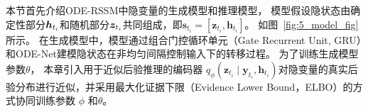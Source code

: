 本节首先介绍ODE-RSSM中隐变量的生成模型和推理模型，
模型假设隐状态由确定性部分$\boldsymbol{h}_{t_i}$和随机部分$\boldsymbol{z}_{t_i}$共同组成，即$\boldsymbol{s}_{t_{i}}=[\boldsymbol{z}_{t_{i}},\boldsymbol{h}_{t_{i}}]$。
如图~\ref{fig:5_model_fig}所示。
在生成模型中，模型通过组合门控循环单元（Gate Recurrent Unit, GRU）和ODE-Net建模隐状态在非均匀间隔控制输入下的转移过程。
为了训练生成模型参数$\theta$， 本章引入用于近似后验推理的编码器 $q_{\phi}\left(\boldsymbol{z}_{t_i} \mid \boldsymbol{y}_{t_i}, \boldsymbol{h}_{t_i}\right)$对隐变量的真实后验分布进行近似，并采用最大化证据下限（Evidence Lower Bound，ELBO）的方式协同训练参数 $\phi$ 和$\theta$。





